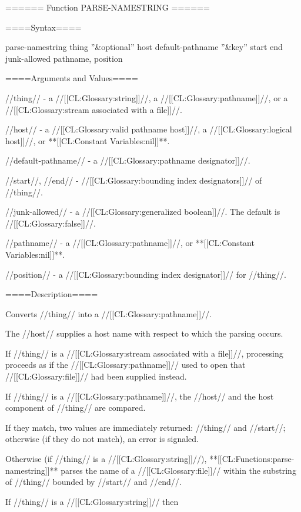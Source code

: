 ====== Function PARSE-NAMESTRING ======

====Syntax====

\DefunWithValuesNewline parse-namestring {thing ''&optional'' host default-pathname ''&key'' start end junk-allowed} {pathname, position}

====Arguments and Values====

//thing// - a //[[CL:Glossary:string]]//, a //[[CL:Glossary:pathname]]//, or a //[[CL:Glossary:stream associated with a file]]//.

//host// - a //[[CL:Glossary:valid pathname host]]//, a //[[CL:Glossary:logical host]]//, or **[[CL:Constant Variables:nil]]**.

//default-pathname// - a //[[CL:Glossary:pathname designator]]//. 

//start//, //end// - //[[CL:Glossary:bounding index designators]]// of //thing//. 

//junk-allowed// - a //[[CL:Glossary:generalized boolean]]//. The default is //[[CL:Glossary:false]]//.

//pathname// - a //[[CL:Glossary:pathname]]//, or **[[CL:Constant Variables:nil]]**.

//position// - a //[[CL:Glossary:bounding index designator]]// for //thing//.

====Description====

Converts //thing// into a //[[CL:Glossary:pathname]]//.

The //host// supplies a host name with respect to which the parsing occurs.

If //thing// is a //[[CL:Glossary:stream associated with a file]]//, processing proceeds as if the //[[CL:Glossary:pathname]]// used to open that //[[CL:Glossary:file]]// had been supplied instead.

If //thing// is a //[[CL:Glossary:pathname]]//, the //host// and the host component of //thing// are compared.

If they match, two values are immediately returned: //thing// and //start//; otherwise (if they do not match), an error is signaled.

Otherwise (if //thing// is a //[[CL:Glossary:string]]//), **[[CL:Functions:parse-namestring]]** parses the name of a //[[CL:Glossary:file]]// within the substring of //thing// bounded by //start// and //end//.

If //thing// is a //[[CL:Glossary:string]]// then

